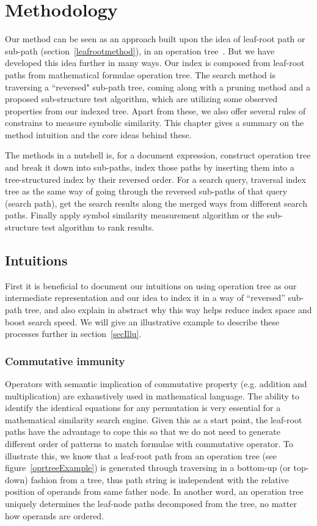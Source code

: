 \chapter{Methodology}
Our method can be seen as an approach built upon the idea of leaf-root path or sub-path (section~\ref{leafrootmethod}), in an operation tree~\cite{goodsurvey}. 
But we have developed this idea further in many ways. 
Our index is composed from leaf-root paths from mathematical formulae operation tree. 
The search method is traversing a ``reversed" sub-path tree, coming along with a pruning method and a proposed sub-structure test algorithm, which are utilizing some observed properties from our indexed tree. 
Apart from these, we also offer several rules of constrains to measure symbolic similarity.
This chapter gives a summary on the method intuition and the core ideas behind these.

The methods in a nutshell is, for a document expression, construct operation tree and break it down into sub-paths, index those paths by inserting them into a tree-structured index by their reversed order. For a search query, traversal index tree as the same way of going through the reversed sub-paths of that query (search path), get the search results along the merged ways from different search paths. Finally apply symbol similarity measurement algorithm or the sub-structure test algorithm to rank results.

\section{Intuitions}
First it is beneficial to document our intuitions on using operation tree as our intermediate representation and our idea to index it in a way of “reversed” sub-path tree, and also explain in abstract why this way helps reduce index space and boost search speed.
We will give an illustrative example to describe these processes further in section~\ref{secIllu}.

\subsection{Commutative immunity}
Operators with semantic implication of commutative property (e.g. addition and multiplication) are exhaustively used in mathematical language. The ability to identify the identical equations for any permutation is very essential for a mathematical similarity search engine. 
Given this as a start point, the leaf-root paths have the advantage to cope this so that we do not need to generate different order of patterns to match formulae with commutative operator. 
To illustrate this, we know that a leaf-root path from an operation tree (see figure~\ref{oprtreeExample}) is generated through traversing in a bottom-up (or top-down) fashion from a tree, thus path string is independent with the relative position of operands from same father node.
In another word, an operation tree uniquely determines the leaf-node paths decomposed from the tree, no matter how operands are ordered. 


